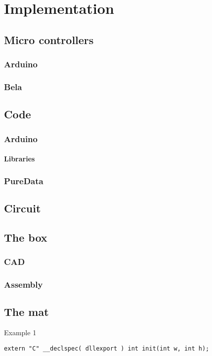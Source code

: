 \chapter{Implementation}%

\section{Micro controllers}%

	\subsection{Arduino}%
		
		
	\subsection{Bela}%
		
	
\section{Code}
	\subsection{Arduino}%
		\subsubsection{Libraries}%
	\subsection{PureData}%
		
	
\section{Circuit}


\section{The box}%

	\subsection{CAD}
		
	\subsection{Assembly}

\section{The mat}%

\begin{listing}[H]
	\caption{Example 1}
	\label{listing:example1}
	\begin{verbatim}
extern "C" __declspec( dllexport ) int init(int w, int h);
	\end{verbatim}
\end{listing}